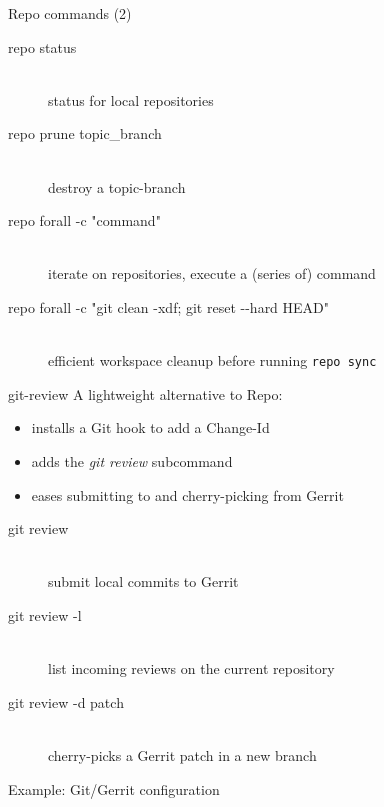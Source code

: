 \begin{frame}{Repo commands (2)}
  \begin{description}
    \item[repo status] \hfill \\
      status for local repositories
    \item[repo prune topic\_branch] \hfill \\
      destroy a topic-branch
    \item[repo forall -c "command"] \hfill \\
      iterate on repositories, execute a (series of) command
    \item[repo forall -c "git clean -xdf; git reset -{}-hard HEAD"] \hfill \\
      efficient workspace cleanup before running \texttt{repo sync}
  \end{description}
\end{frame}

\begin{frame}{git-review}
  A lightweight alternative to Repo:
  \begin{itemize}
    \item installs a Git hook to add a Change-Id
    \item adds the \textit{git review} subcommand
    \item eases submitting to and cherry-picking from Gerrit
  \end{itemize}  
  \begin{description}
    \item[git review] \hfill \\
      submit local commits to Gerrit
    \item[git review -l] \hfill \\
      list incoming reviews on the current repository
    \item[git review -d patch] \hfill \\
      cherry-picks a Gerrit patch in a new branch
  \end{description}
\end{frame}

\begin{frame}[fragile]{Example: Git/Gerrit configuration}
  \begin{columns}[t]
    \begin{column}{0.5\textwidth}
      
    \end{column}
    \begin{column}{0.5\textwidth}
      
    \end{column}
  \end{columns}
\end{frame}
